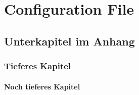 %
\chapter{Configuration File} \label{app:txtConfigFile}%

%
\section{Unterkapitel im Anhang} \label{refSectionAnhang}%
%
\blindtext%
%
\subsection{Tieferes Kapitel}%
%
\subsubsection{Noch tieferes Kapitel}%
%
\blindtext%
%
%
%
